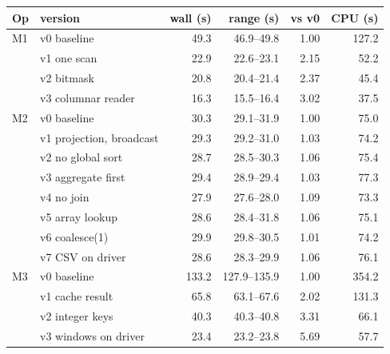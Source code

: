 \documentclass[sigconf]{acmart}
\begin{document}
\par\medskip\noindent\begin{minipage}{\columnwidth}
\centering\scriptsize\setlength{\tabcolsep}{3pt}
\label{tab:linux-summary}
\begin{tabular}{@{}llrrrr@{}}
\toprule
Op & version & wall (s) & range (s) & vs v0 & CPU (s) \\
\midrule
M1 & v0 baseline & 49.3 & 46.9--49.8 & 1.00 & 127.2 \\
 & v1 one scan & 22.9 & 22.6--23.1 & 2.15 & 52.2 \\
 & v2 bitmask & 20.8 & 20.4--21.4 & 2.37 & 45.4 \\
 & v3 columnar reader & 16.3 & 15.5--16.4 & 3.02 & 37.5 \\
\midrule
M2 & v0 baseline & 30.3 & 29.1--31.9 & 1.00 & 75.0 \\
 & v1 projection, broadcast & 29.3 & 29.2--31.0 & 1.03 & 74.2 \\
 & v2 no global sort & 28.7 & 28.5--30.3 & 1.06 & 75.4 \\
 & v3 aggregate first & 29.4 & 28.9--29.4 & 1.03 & 77.3 \\
 & v4 no join & 27.9 & 27.6--28.0 & 1.09 & 73.3 \\
 & v5 array lookup & 28.6 & 28.4--31.8 & 1.06 & 75.1 \\
 & v6 coalesce(1) & 29.9 & 29.8--30.5 & 1.01 & 74.2 \\
 & v7 CSV on driver & 28.6 & 28.3--29.9 & 1.06 & 76.1 \\
\midrule
M3 & v0 baseline & 133.2 & 127.9--135.9 & 1.00 & 354.2 \\
 & v1 cache result & 65.8 & 63.1--67.6 & 2.02 & 131.3 \\
 & v2 integer keys & 40.3 & 40.3--40.8 & 3.31 & 66.1 \\
 & v3 windows on driver & 23.4 & 23.2--23.8 & 5.69 & 57.7 \\
\bottomrule
\end{tabular}
\end{minipage}
\end{document}
